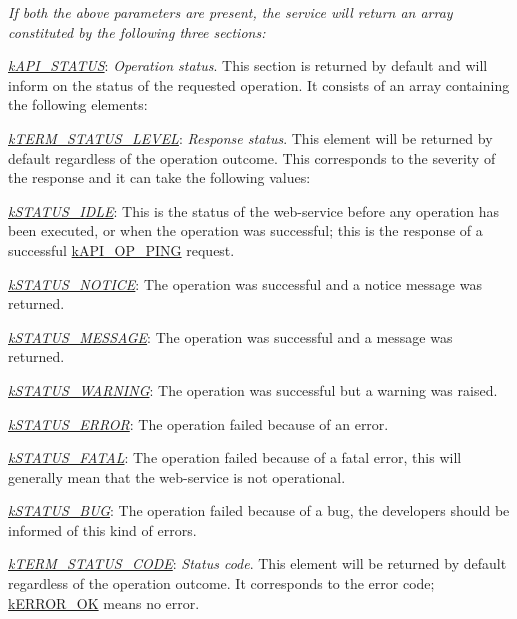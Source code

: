 {\itshape If both the above parameters are present, the service will return an array constituted by the following three sections\-:}

{\itshape 
\begin{DoxyItemize}
\item {\itshape \hyperlink{}{k\-A\-P\-I\-\_\-\-S\-T\-A\-T\-U\-S}}\-: {\itshape Operation status}. This section is returned by default and will inform on the status of the requested operation. It consists of an array containing the following elements\-: 
\begin{DoxyItemize}
\item {\itshape \hyperlink{}{k\-T\-E\-R\-M\-\_\-\-S\-T\-A\-T\-U\-S\-\_\-\-L\-E\-V\-E\-L}}\-: {\itshape Response status}. This element will be returned by default regardless of the operation outcome. This corresponds to the severity of the response and it can take the following values\-: 
\begin{DoxyItemize}
\item {\itshape \hyperlink{}{k\-S\-T\-A\-T\-U\-S\-\_\-\-I\-D\-L\-E}}\-: This is the status of the web-\/service before any operation has been executed, or when the operation was successful; this is the response of a successful \hyperlink{}{k\-A\-P\-I\-\_\-\-O\-P\-\_\-\-P\-I\-N\-G} request. 
\item {\itshape \hyperlink{}{k\-S\-T\-A\-T\-U\-S\-\_\-\-N\-O\-T\-I\-C\-E}}\-: The operation was successful and a notice message was returned. 
\item {\itshape \hyperlink{}{k\-S\-T\-A\-T\-U\-S\-\_\-\-M\-E\-S\-S\-A\-G\-E}}\-: The operation was successful and a message was returned. 
\item {\itshape \hyperlink{}{k\-S\-T\-A\-T\-U\-S\-\_\-\-W\-A\-R\-N\-I\-N\-G}}\-: The operation was successful but a warning was raised. 
\item {\itshape \hyperlink{}{k\-S\-T\-A\-T\-U\-S\-\_\-\-E\-R\-R\-O\-R}}\-: The operation failed because of an error. 
\item {\itshape \hyperlink{}{k\-S\-T\-A\-T\-U\-S\-\_\-\-F\-A\-T\-A\-L}}\-: The operation failed because of a fatal error, this will generally mean that the web-\/service is not operational. 
\item {\itshape \hyperlink{}{k\-S\-T\-A\-T\-U\-S\-\_\-\-B\-U\-G}}\-: The operation failed because of a bug, the developers should be informed of this kind of errors. 
\end{DoxyItemize}
\item {\itshape \hyperlink{}{k\-T\-E\-R\-M\-\_\-\-S\-T\-A\-T\-U\-S\-\_\-\-C\-O\-D\-E}}\-: {\itshape Status code}. This element will be returned by default regardless of the operation outcome. It corresponds to the error code; \hyperlink{}{k\-E\-R\-R\-O\-R\-\_\-\-O\-K} means no error. 

\end{DoxyItemize}
\end{DoxyItemize}}
